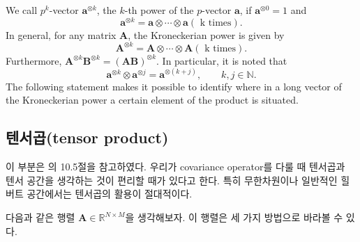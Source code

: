 \documentclass[b5paper,]{scrbook}
\theoremstyle{plain}
\theoremstyle{definition}
\numberwithin{equation}{section}
\begin{document}
We call \(p^{k}\)-vector \(\mathbf{a}^{\otimes k}\), the \(k\)-th power of the \(p\)-vector \(\mathbf{a}\), if \(\mathbf{a}^{\otimes 0}=1\) and
\[\mathbf{a}^{\otimes k} = \mathbf{a} \otimes \cdots \otimes\mathbf{a} (\text{ k times}).\]
In general, for any matrix \(\mathbf{A}\), the Kroneckerian power is given by
\[\mathbf{A}^{\otimes k} = \mathbf{A} \otimes \cdots \otimes\mathbf{A} (\text{ k times}).\]
Furthermore, \(\mathbf{A}^{\otimes k}\mathbf{B}^{\otimes k}=(\mathbf{A}\mathbf{B})^{\otimes k}\). In particular, it is noted that
\[\mathbf{a}^{\otimes k}\otimes\mathbf{a}^{\otimes j}= \mathbf{a}^{\otimes (k+ j)}, \qquad{k,j\in\mathbb{N}.}\]
The following statement makes it possible to identify where in a long vector of the Kroneckerian power a certain element of the product is situated.

\hypertarget{tensor-product}{%
\subsection{텐서곱(tensor product)}\label{tensor-product}}

이 부분은 \citep{Kokoszka2017}의 10.5절을 참고하였다. 우리가 covariance operator를 다룰 때 텐서곱과 텐서 공간을 생각하는 것이 편리할 때가 있다고 한다. 특히 무한차원이나 일반적인 힐버트 공간에서는 텐서곱의 활용이 절대적이다.

다음과 같은 행렬 \(\mathbf{A}\in\mathbb{R}^{N\times M}\)을 생각해보자. 이 행렬은 세 가지 방법으로 바라볼 수 있다.
\end{document}
